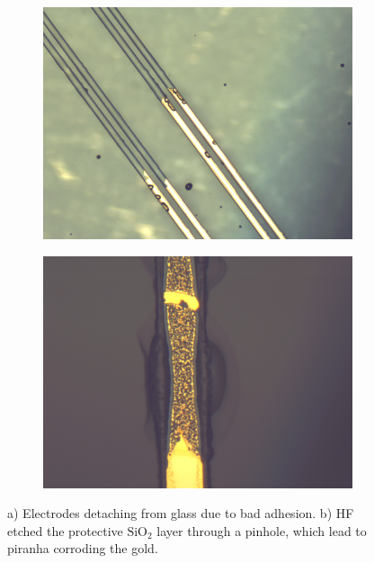 \documentclass[final]{jyflluk}
\begin{document}
\begin{figure}[h!]
    \centering
    \begin{subfigure}[h]{0.48\textwidth}
        \centering
        \includegraphics[width=\linewidth]{optical/eledetach.png} 
        \caption{} \label{fig:lileee}
    \end{subfigure}
    \hfill
    \begin{subfigure}[h]{0.48\textwidth}
        \centering
        \includegraphics[width=\linewidth]{optical/piranha_ate.png} 
        \caption{} \label{fig:lellqqq}
    \end{subfigure}
    \caption{a) Electrodes detaching from glass due to bad adhesion. b) HF etched the protective $\mathrm{SiO_2}$ layer through a pinhole, which lead to piranha corroding the gold.} \label{fig:eleproblem}
\end{figure}  
\end{document}
